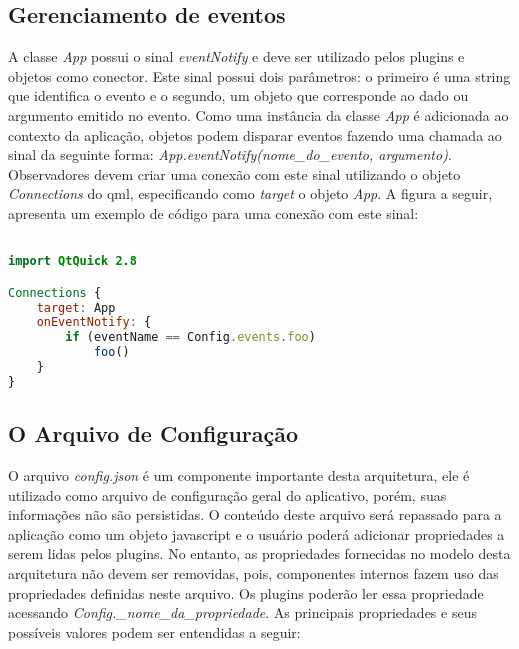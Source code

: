 \subsection{Gerenciamento de eventos}
A classe \textit{App} possui o sinal \textit{eventNotify} e deve ser utilizado pelos plugins e objetos como conector. Este sinal possui dois parâmetros: o primeiro é uma string que identifica o evento e o segundo, um objeto que corresponde ao dado ou argumento emitido no evento. Como uma instância da classe \textit{App} é adicionada ao contexto da aplicação, objetos podem disparar eventos fazendo uma chamada ao sinal da seguinte forma: \textit{App.eventNotify(nome\_do\_evento, argumento)}. Observadores devem criar uma conexão com este sinal utilizando o objeto \textit{Connections} do qml, especificando como \textit{target} o objeto \textit{App}. A figura a seguir, apresenta um exemplo de código para uma conexão com este sinal:

\begin{center}
\begin{lstlisting}[language=qml]

import QtQuick 2.8

Connections {
    target: App
    onEventNotify: {
        if (eventName == Config.events.foo)
            foo()
    }
}
\end{lstlisting}
\end{center}


\subsection{O Arquivo de Configuração}\label{sec:solucao-desenvolvida}
O arquivo \textit{config.json} é um componente importante desta arquitetura, ele é utilizado como arquivo de configuração geral do aplicativo, porém, suas informações não são persistidas. O conteúdo deste arquivo será repassado para a aplicação como um objeto javascript e o usuário poderá adicionar propriedades a serem lidas pelos plugins. No entanto, as propriedades fornecidas no modelo desta arquitetura não devem ser removidas, pois, componentes internos fazem uso das propriedades definidas neste arquivo. Os plugins poderão ler essa propriedade acessando \textit{Config.\_nome\_da\_propriedade}. As principais propriedades e seus possíveis valores podem ser entendidas a seguir:

